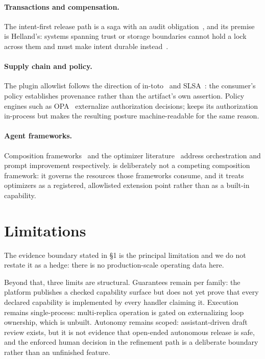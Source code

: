\documentclass{article}
\begin{document}
\paragraph{Transactions and compensation.} The intent-first release path is a saga
with an audit obligation~\cite{garciamolina1987sagas,gray1981transaction}, and its
premise is Helland's: systems spanning trust or storage boundaries cannot hold a
lock across them and must make intent durable
instead~\cite{helland2007apostates,kleppmann2017ddia}.

\paragraph{Supply chain and policy.} The plugin allowlist follows the direction of
in-toto~\cite{torresarias2019intoto} and SLSA~\cite{slsa}: the consumer's policy
establishes provenance rather than the artifact's own assertion. Policy engines such
as OPA~\cite{opa} externalize authorization decisions; \sys keeps its authorization
in-process but makes the resulting posture machine-readable for the same reason.

\paragraph{Agent frameworks.} Composition frameworks~\cite{langchain,llamaindex,crewai,wu2024autogen,agentssdk}
and the optimizer literature~\cite{khattab2024dspy,opsahlong2024mipro,agrawal2025gepa}
address orchestration and prompt improvement respectively. \sys is deliberately not a
competing composition framework: it governs the resources those frameworks consume,
and it treats optimizers as a registered, allowlisted extension point rather than as
a built-in capability.

\section{Limitations}

The evidence boundary stated in \S1 is the principal limitation and we do not
restate it as a hedge: there is no production-scale operating data here.

Beyond that, three limits are structural. Guarantees remain per family: the platform
publishes a checked capability surface but does not yet prove that every declared
capability is implemented by every handler claiming it. Execution remains
single-process: multi-replica operation is gated on externalizing loop ownership,
which is unbuilt. Autonomy remains scoped: assistant-driven draft review exists, but
it is not evidence that open-ended autonomous release is safe, and the enforced human
decision in the refinement path is a deliberate boundary rather than an unfinished
feature.
\end{document}
